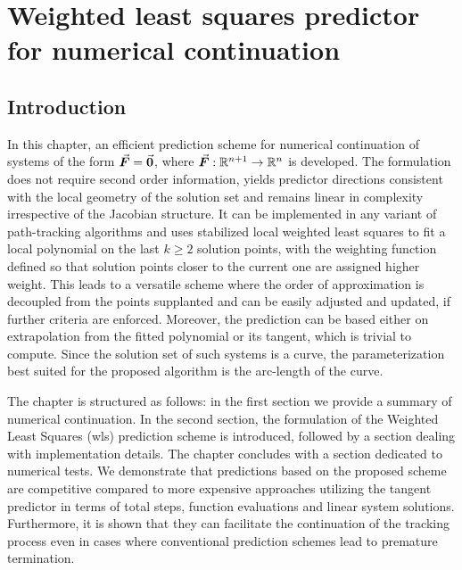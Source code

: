 \chapter{Weighted least squares predictor for numerical continuation}\label{CH5}

\section{Introduction}\label{CH5-S1}

In this chapter, an efficient prediction 
scheme for numerical continuation of systems of the form $\vec{\bm{F}}=\vec{\bm{0}}$, 
where $\vec{\bm{F}}:\mathbb{R}^{n+1}\rightarrow\mathbb{R}^n$ 
is developed. The formulation does not require second order information, yields 
predictor 
directions consistent with the local geometry of the solution set and remains 
linear in complexity irrespective of the Jacobian structure. It can be 
implemented in any variant of path-tracking algorithms and uses
stabilized local
weighted least squares to fit a local polynomial on the last $k\geq 2$ solution
points, with the weighting function defined so that solution points closer to
the current one are assigned higher weight. This leads to a
versatile scheme where the order of approximation is decoupled from the
points supplanted and can be easily adjusted and updated, if further criteria
are enforced. Moreover, the prediction can be based either on extrapolation 
from the fitted polynomial or its tangent, which is trivial to compute. Since
the solution set of such systems is a curve, the parameterization best suited
for the proposed algorithm is the arc-length of the curve. 

The chapter is structured as follows: in the first section we provide a summary 
of 
numerical continuation. In the second section, the formulation of the Weighted 
Least Squares (\acrshort{wls}) prediction scheme is introduced, followed by a 
section dealing with implementation details. The chapter concludes with a 
section dedicated to numerical tests. We
demonstrate that predictions based on the proposed scheme are competitive
compared to more expensive approaches utilizing the tangent predictor in
terms of total steps, function evaluations and linear system solutions. 
Furthermore, it
is shown that they can facilitate the continuation of the tracking process 
even in cases where conventional prediction schemes lead to premature
termination. 


